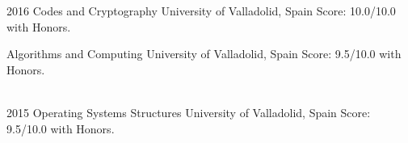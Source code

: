 \documentclass[]{friggeri-cv} %
\begin{document}
\begin{entrylist}


\entry
{2016}
{Codes and Cryptography}
{University of Valladolid, Spain}
{Score: 10.0/10.0 with Honors.}

\entry
{}
{Algorithms and Computing}
{University of Valladolid, Spain}
{Score: 9.5/10.0 with Honors.}

\\
\entry
{2015}
{Operating Systems Structures}
{University of Valladolid, Spain}
{Score: 9.5/10.0 with Honors.}


\end{entrylist}
\\
\begin{comment}

    \section{technical skills}
    \hfill

        Java\quad{\color{red} $\varheartsuit\varheartsuit\varheartsuit\varheartsuit\varheartsuit\varheartsuit\varheartsuit\varheartsuit\varheartsuit\varheartsuit\varheartsuit\varheartsuit\varheartsuit\varheartsuit$}{\color{black} $\varheartsuit$} \\

        Android\quad{\color{red} $\varheartsuit\varheartsuit\varheartsuit\varheartsuit\varheartsuit\varheartsuit\varheartsuit\varheartsuit\varheartsuit\varheartsuit\varheartsuit\varheartsuit$}{\color{black} $\varheartsuit\varheartsuit\varheartsuit$} \\

        Python\quad{\color{red} $\varheartsuit\varheartsuit\varheartsuit\varheartsuit\varheartsuit\varheartsuit\varheartsuit\varheartsuit\varheartsuit$}{\color{black} $\varheartsuit\varheartsuit\varheartsuit\varheartsuit\varheartsuit\varheartsuit$} \\

        JavaScript\quad{\color{red} $\varheartsuit\varheartsuit\varheartsuit\varheartsuit\varheartsuit\varheartsuit\varheartsuit$}{\color{black} $\varheartsuit\varheartsuit\varheartsuit\varheartsuit\varheartsuit\varheartsuit\varheartsuit\varheartsuit$} \\


\end{comment}
\end{document}
